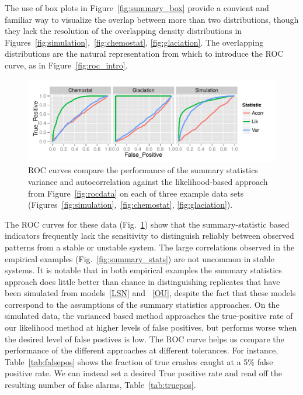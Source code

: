 \documentclass[authoryear,review,11pt]{elsarticle}
\begin{document}
The use of box plots in Figure~\ref{fig:summary_box} provide a convient and familiar way 
to visualize the overlap between more than two distributions,
though they lack the resolution of the overlapping density distributions in 
Figures~\ref{fig:simulation},~\ref{fig:chemostat}, \ref{fig:glaciation}.  
The overlapping distributions are the natural representation from which to introduce the ROC curve, as in Figure~\ref{fig:roc_intro}.  




 \begin{figure}
   \begin{center}
     \includegraphics[width=\linewidth]{figures/summary_roc.pdf}
     \caption{ROC curves compare the performance of the summary statistics variance and autocorrelation against the likelihood-based approach from Figure~\ref{fig:rocdata} on each of three example data sets (Figures~\ref{fig:simulation},~\ref{fig:chemostat}, \ref{fig:glaciation}).}
     \label{fig:summary_roc}
  \end{center}
 \end{figure}



 The ROC curves for these data (Fig.~\ref{fig:summary_roc}) show that the summary-statistic based indicators
frequently lack the sensitivity to distinguish reliably between observed patterns from a stable or unstable system.
The large correlations observed in the empirical examples (Fig.~\ref{fig:summary_stats}) are not uncommon in stable systems.
It is notable that in both empirical examples the summary statistics approach does little better than chance in distinguishing 
replicates that have been simulated from models~\eqref{LSN} and ~\eqref{OU}, 
despite the fact that these models correspond 
to the assumptions of the summary statistics approaches.  
On the simulated data, the varianced based method approaches the 
true-positive rate of our likelihood method at higher levels of false positives, 
but performs worse when the desired level of false postives is low.  
The ROC curve helps us compare the performance of the different approaches at different tolerances.  
For instance, Table~\ref{tab:falsepos} shows the fraction of true crashes caught at a 5\% false positive rate.
We can instead set a desired True positive rate and read off the resulting number of false alarms, Table~\ref{tab:truepos}.  
\end{document}
